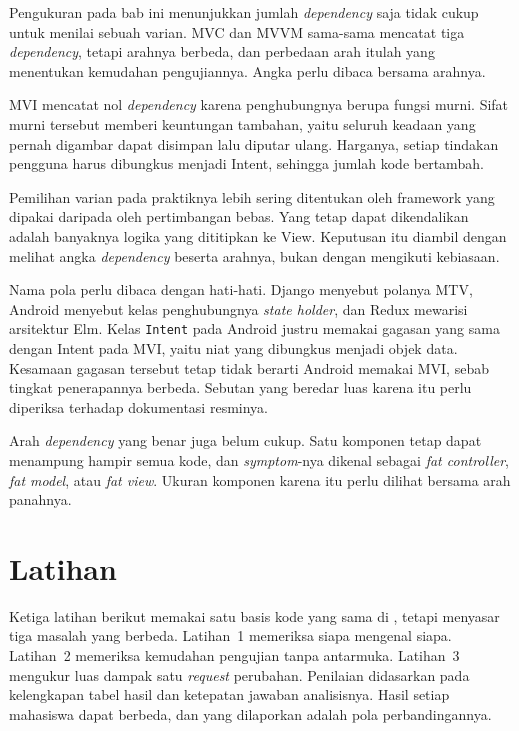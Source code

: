 Pengukuran pada bab ini menunjukkan jumlah \textit{dependency} saja tidak cukup untuk
menilai sebuah varian. MVC dan MVVM sama-sama mencatat tiga \textit{dependency},
tetapi arahnya berbeda, dan perbedaan arah itulah yang menentukan kemudahan
pengujiannya. Angka perlu dibaca bersama arahnya.

MVI mencatat nol \textit{dependency} karena penghubungnya berupa fungsi murni.
Sifat murni tersebut memberi keuntungan tambahan, yaitu seluruh keadaan yang
pernah digambar dapat disimpan lalu diputar ulang. Harganya, setiap tindakan
pengguna harus dibungkus menjadi Intent, sehingga jumlah kode bertambah.

Pemilihan varian pada praktiknya lebih sering ditentukan oleh framework yang
dipakai daripada oleh pertimbangan bebas. Yang tetap dapat dikendalikan adalah
banyaknya logika yang dititipkan ke View. Keputusan itu diambil dengan melihat
angka \textit{dependency} beserta arahnya, bukan dengan mengikuti kebiasaan.

Nama pola perlu dibaca dengan hati-hati. Django menyebut polanya MTV, Android
menyebut kelas penghubungnya \textit{state holder}, dan Redux mewarisi
arsitektur Elm. Kelas \texttt{Intent} pada Android justru memakai gagasan yang
sama dengan Intent pada MVI, yaitu niat yang dibungkus menjadi objek data.
Kesamaan gagasan tersebut tetap tidak berarti Android memakai MVI, sebab
tingkat penerapannya berbeda. Sebutan yang beredar luas karena itu perlu
diperiksa terhadap dokumentasi resminya.

Arah \textit{dependency} yang benar juga belum cukup. Satu komponen tetap dapat
menampung hampir semua kode, dan \textit{symptom}-nya dikenal sebagai \textit{fat
controller}, \textit{fat model}, atau \textit{fat view}. Ukuran komponen karena
itu perlu dilihat bersama arah panahnya.

\section{Latihan}

Ketiga latihan berikut memakai satu basis kode yang sama di
, tetapi menyasar tiga masalah yang berbeda.
Latihan~1 memeriksa siapa mengenal siapa. Latihan~2 memeriksa kemudahan
pengujian tanpa antarmuka. Latihan~3 mengukur luas dampak satu \textit{request}
perubahan. Penilaian didasarkan pada kelengkapan tabel hasil dan ketepatan
jawaban analisisnya. Hasil setiap mahasiswa dapat berbeda, dan yang dilaporkan
adalah pola perbandingannya.

